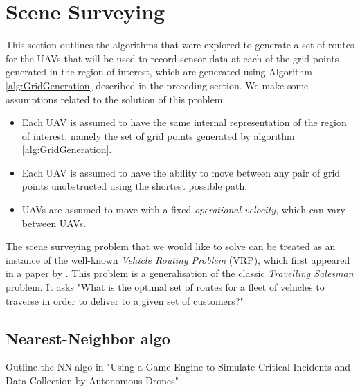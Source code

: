 
\section{Scene Surveying}
This section outlines the algorithms that were explored to generate a set of routes for the UAVs that will be used to record sensor data at each of the grid points generated in the region of interest, which are generated using Algorithm \ref{alg:GridGeneration} described in the preceding section. We make some assumptions related to the solution of this problem:
\begin{itemize}
    \item Each UAV is assumed to have the same internal representation of the region of interest, namely the set of grid points generated by algorithm \ref{alg:GridGeneration}.
    \item Each UAV is assumed to have the ability to move between any pair of grid points unobstructed using the shortest possible path.
    \item UAVs are assumed to move with a fixed \textit{operational velocity}, which can vary between UAVs.
\end{itemize}


The scene surveying problem that we would like to solve can be treated as an instance of the well-known \textit{Vehicle Routing Problem} (VRP), which first appeared in a paper by \citeauthor{Dantzig1959TheProblem} \cite{Dantzig1959TheProblem}. This problem is a generalisation of the classic \textit{Travelling Salesman} problem. It asks "What is the optimal set of routes for a fleet of vehicles to traverse in order to deliver to a given set of customers?"

\subsection{Nearest-Neighbor algo}
Outline the NN algo in "Using a Game Engine to Simulate Critical Incidents
and Data Collection by Autonomous Drones"

\subsubsection{}